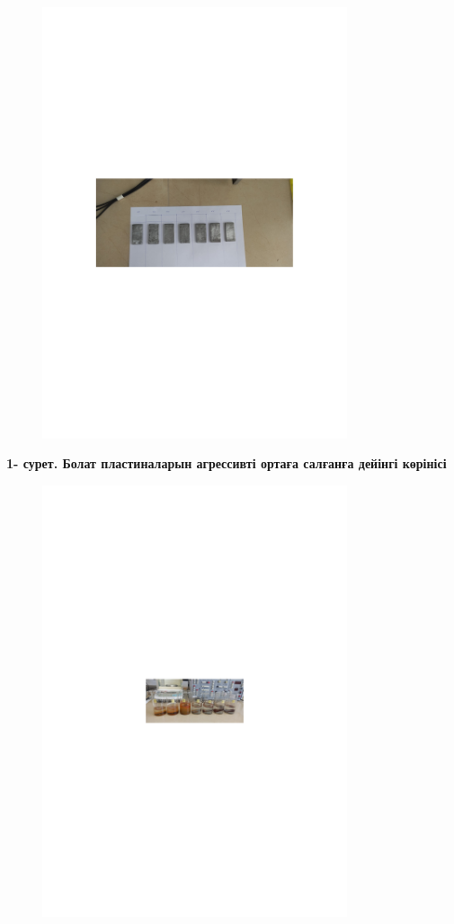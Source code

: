 \begin{figure}[H]
	\centering
	\includegraphics[width=0.8\textwidth]{media/gor/image23}
	\caption*{}
\end{figure}


{\bfseries 1- сурет. Болат пластиналарын агрессивті ортаға салғанға дейінгі
көрінісі}

\begin{figure}[H]
	\centering
	\includegraphics[width=0.8\textwidth]{media/gor/image24}
	\caption*{}
\end{figure}


